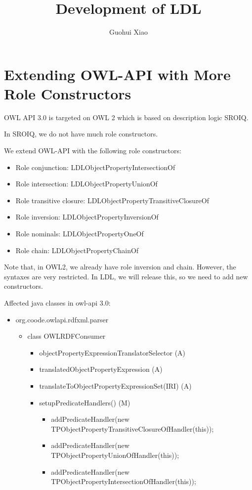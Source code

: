 \documentclass{article}
\begin{document}
\title{Development of LDL}

\author{Guohui Xiao}

\maketitle

\section{Extending OWL-API with More Role Constructors}
 
 

OWL API 3.0 is targeted on OWL 2 which is based on description logic
SROIQ.

In SROIQ, we do not have much role constructors.

We extend OWL-API
with the following role constructors:
\begin{itemize}
\item Role conjunction: LDLObjectPropertyIntersectionOf
\item Role intersection: LDLObjectPropertyUnionOf
\item Role transitive closure: LDLObjectPropertyTransitiveClosureOf
\item Role inversion: LDLObjectPropertyInversionOf
\item Role nominals: LDLObjectPropertyOneOf
\item Role chain: LDLObjectPropertyChainOf
\end{itemize}
 
 Note that, in OWL2, we already have role inversion
and chain. 
 However, the syntaxes are very restricted. 
 In LDL, we
will release this, so we need to add new constructors.
 
 Affected
java classes in owl-api 3.0:
 
\begin{itemize}
\item org.coode.owlapi.rdfxml.parser
  \begin{itemize}
  \item class OWLRDFConsumer 
    \begin{itemize}
    \item objectPropertyExpressionTranslatorSelector (A)
    \item translatedObjectPropertyExpression (A)
    \item translateToObjectPropertyExpressionSet(IRI) (A)
    \item setupPredicateHandlers() (M)
      \begin{itemize}
      \item addPredicateHandler(new
        TPObjectPropertyTransitiveClosureOfHandler(this));
      \item addPredicateHandler(new
        TPObjectPropertyUnionOfHandler(this));
      \item addPredicateHandler(new
        TPObjectPropertyIntersectionOfHandler(this));
 
      \end{itemize}
    \end{itemize}
  \end{itemize}
\end{itemize}
 
\end{document}
